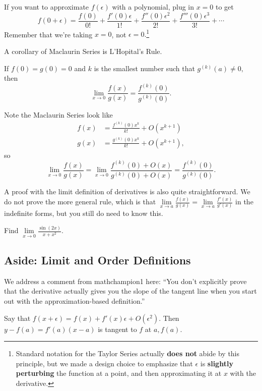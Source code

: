 \documentclass{article}
\begin{document}
\begin{defi}
If you want to approximate $f(\epsilon)$ with a polynomial, plug in $x=0$ to get
\[f(0+\epsilon)=\frac{f(0)}{0!}+\frac{f'(0)\epsilon}{1!}+\frac{f''(0)\epsilon^2}{2!}+\frac{f'''(0)\epsilon^3}{3!}+\cdots\]
Remember that we're taking $x=0$, not $\epsilon=0.$\footnote{Standard notation for the Taylor Series actually \textbf{does not} abide by this principle, but we made a design choice to emphasize that $\epsilon$ is \textbf{slightly perturbing} the function at a point, and then approximating it at $x$ with the derivative.}
\end{defi}

A corollary of Maclaurin Series is L'Hopital's Rule.

\begin{theo}
If $f(0)=g(0)=0$ and $k$ is the smallest number such that $g^{(k)}(a)\neq 0,$ then
\[\lim_{x\to 0}\frac{f(x)}{g(x)}=\frac{f^{(k)}(0)}{g^{(k)}(0)}.\]
\end{theo}

\begin{pro}
Note the Maclaurin Series look like
\begin{align*}
f(x)&=\frac{f^{(k)}(0)x^k}{k!}+O(x^{k+1})\\
g(x)&=\frac{g^{(k)}(0)x^k}{k!}+O(x^{k+1}),
\end{align*}
so
\[\lim_{x\to 0}\frac{f(x)}{g(x)}=\lim_{x\to 0}\frac{f^{(k)}(0)+O(x)}{g^{(k)}(0)+O(x)}=\frac{f^{(k)}(0)}{g^{(k)}(0)}.\]
\end{pro}

A proof with the limit definition of derivatives is also quite straightforward. We do not prove the more general rule, which is that $\lim\limits_{x\to a}\frac{f(x)}{g(x)}=\lim\limits_{x\to a}\frac{f'(x)}{g'(x)}$ in the indefinite forms, but you still do need to know this.

\begin{exer}
Find $\lim\limits_{x\to 0}\frac{\sin(2x)}{x+x^2}.$
\end{exer}

\subsection{Aside: Limit and Order Definitions}
We address a comment from mathchampion1 here: ``You don't explicitly prove that the derivative actually gives you the slope of the tangent line when you start out with the approximation-based definition.''

\begin{theo}
Say that $f(x+\epsilon)=f(x)+f'(x)\epsilon+O(\epsilon^2).$ Then $y-f(a)=f'(a)(x-a)$ is tangent to $f$ at $a,f(a).$
\end{theo}
\end{document}
